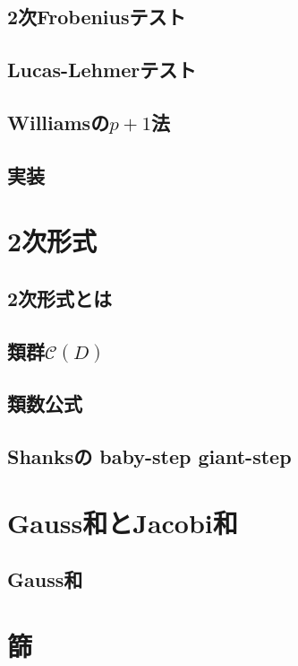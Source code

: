 \subsection{2次Frobeniusテスト}

\subsection{Lucas-Lehmerテスト}

\subsection{Williamsの$p+1$法}

\subsection{実装}


\section{2次形式}
\subsection{2次形式とは}

\subsection{類群$\mathcal{C}(D)$}

\subsection{類数公式}

\subsection{Shanksの baby-step giant-step}


\section{Gauss和とJacobi和}
\subsection{Gauss和}


\section{篩}
